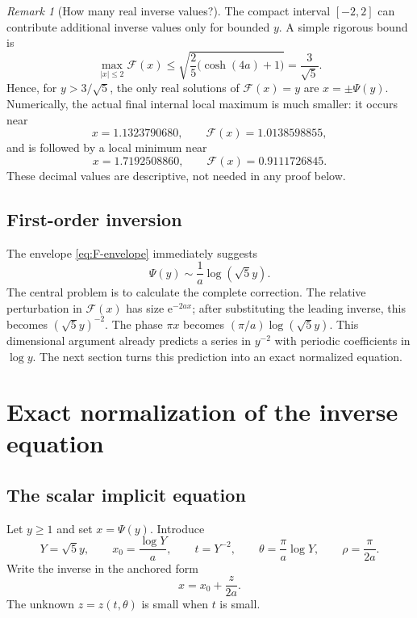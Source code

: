 \documentclass[11pt,oneside]{article}
\theoremstyle{plain}
\theoremstyle{definition}
\theoremstyle{remark}
\newtheorem{remark}[theorem]{Remark}
\newcommand{\e}{\mathrm{e}}
\newcommand{\Fcal}{\mathcal{F}}
\newcommand{\abs}[1]{\left\lvert#1\right\rvert}
\begin{document}
\begin{remark}[How many real inverse values?]
\label{rem:branch-count}
The compact interval \([-2,2]\) can contribute additional inverse values only
for bounded \(y\).  A simple rigorous bound is
\[
 \max_{\abs{x}\le2}\Fcal(x)
 \le \sqrt{\frac25\bigl(\cosh(4a)+1\bigr)}
 =\frac3{\sqrt5}.
\]
Hence, for \(y>3/\sqrt5\), the only real solutions of \(\Fcal(x)=y\) are
\(x=\pm\Psi(y)\).  Numerically, the actual final internal local maximum is much
smaller: it occurs near
\[
 x=1.1323790680,\qquad \Fcal(x)=1.0138598855,
\]
and is followed by a local minimum near
\[
 x=1.7192508860,\qquad \Fcal(x)=0.9111726845.
\]
These decimal values are descriptive, not needed in any proof below.
\end{remark}

\subsection{First-order inversion}

The envelope \eqref{eq:F-envelope} immediately suggests
\begin{equation}
 \Psi(y)\sim \frac1a\log(\sqrt5y).
 \label{eq:leading-inverse}
\end{equation}
The central problem is to calculate the complete correction.  The relative
perturbation in \(\Fcal(x)\) has size \(\e^{-2ax}\); after substituting the
leading inverse, this becomes \((\sqrt5y)^{-2}\).  The phase
\(\pi x\) becomes \((\pi/a)\log(\sqrt5y)\).  This dimensional argument already
predicts a series in \(y^{-2}\) with periodic coefficients in \(\log y\).  The
next section turns this prediction into an exact normalized equation.

\section{Exact normalization of the inverse equation}
\label{sec:normalization}

\subsection{The scalar implicit equation}

Let \(y\ge1\) and set \(x=\Psi(y)\).  Introduce
\begin{equation}
 Y=\sqrt5y,
 \qquad x_0=\frac{\log Y}{a},
 \qquad t=Y^{-2},
 \qquad \theta=\frac{\pi}{a}\log Y,
 \qquad \rho=\frac{\pi}{2a}.
 \label{eq:normalization-variables}
\end{equation}
Write the inverse in the anchored form
\begin{equation}
 x=x_0+\frac{z}{2a}.
 \label{eq:x-z-substitution}
\end{equation}
The unknown \(z=z(t,\theta)\) is small when \(t\) is small.
\end{document}
